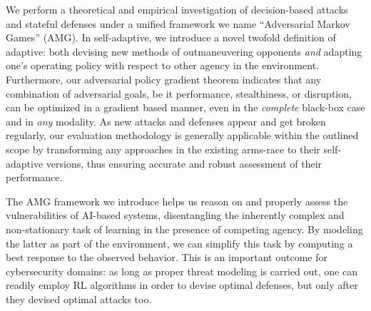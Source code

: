 We perform a theoretical and empirical investigation of decision-based attacks and stateful defenses under a unified framework we name ``Adversarial Markov Games'' (AMG).
In self-adaptive, we introduce a novel twofold definition of adaptive: both devising new methods of outmaneuvering opponents \textit{and} adapting one's operating policy with respect to other agency in the environment.
Furthermore, our adversarial policy gradient theorem indicates that any combination of adversarial goals, be it performance, stealthiness, or disruption, can be optimized in a gradient based manner, even in the \emph{complete} black-box case and in \emph{any} modality.
As new attacks and defenses appear and get broken regularly, our evaluation methodology is generally applicable within the outlined scope by transforming any approaches in the existing arms-race to their self-adaptive versions, thus ensuring accurate and robust assessment of their performance.

The AMG framework we introduce helps us reason on and properly assess the vulnerabilities of AI-based systems, disentangling the inherently complex and non-stationary task of learning in the presence of competing agency.
By modeling the latter as part of the environment, we can simplify this task by computing a best response to the observed behavior.
This is an important outcome for cybersecurity domains: as long as proper threat modeling is carried out, one can readily employ \gls{RL} algorithms in order to devise optimal defenses, but only after they devised optimal attacks too.